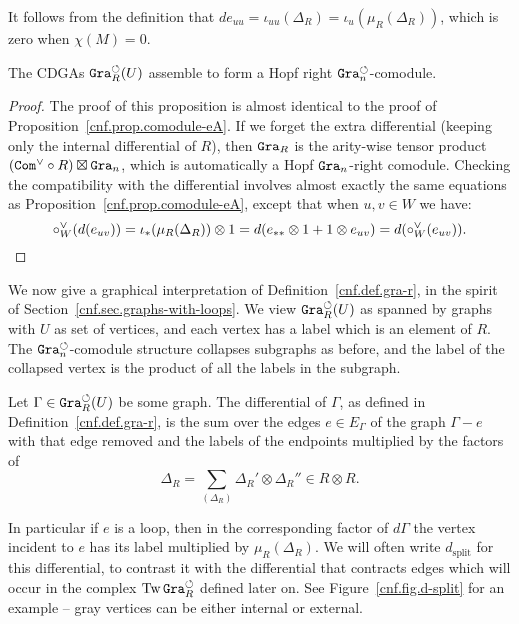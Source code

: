 \begin{remark}
  \label{cnf.rmk.loop-multi}
  It follows from the definition that $d e_{uu} = \iota_{uu}(\Delta_{R}) = \iota_{u}(\mu_{R}(\Delta_{R}))$, which is zero when $\chi(M) = 0$.
\end{remark}

\begin{proposition}
  \label{cnf.prop.gra-tad-comod}
  The CDGAs $\mathtt{Gra}^{\circlearrowleft}_{R}(U)$ assemble to form a Hopf right $\mathtt{Gra}^{\circlearrowleft}_{n}$-comodule.
\end{proposition}
\begin{proof}
  The proof of this proposition is almost identical to the proof of Proposition~\ref{cnf.prop.comodule-eA}.
  If we forget the extra differential (keeping only the internal differential of $R$), then $\mathtt{Gra}_{R}$ is the arity-wise tensor product $(\mathtt{Com}^{\vee} \circ R) \boxtimes \mathtt{Gra}_{n}$, which is automatically a Hopf $\mathtt{Gra}_{n}$-right comodule.
  Checking the compatibility with the differential involves almost exactly the same equations as Proposition~\ref{cnf.prop.comodule-eA}, except that when $u,v \in W$ we have:
  \[ \circ_{W}^{\vee}(d(e_{uv})) = \iota_{*}(\mu_{R}(\Delta_{R})) \otimes 1 = d(e_{**} \otimes 1 + 1 \otimes e_{uv}) = d(\circ_{W}^{\vee}(e_{uv})).
    \qedhere \]
\end{proof}

We now give a graphical interpretation of Definition~\ref{cnf.def.gra-r}, in the spirit of Section~\ref{cnf.sec.graphs-with-loops}.
We view $\mathtt{Gra}^{\circlearrowleft}_{R}(U)$ as spanned by graphs with $U$ as set of vertices, and each vertex has a label which is an element of $R$.
The $\mathtt{Gra}^{\circlearrowleft}_{n}$-comodule structure collapses subgraphs as before, and the label of the collapsed vertex is the product of all the labels in the subgraph.

Let $\Gamma \in \mathtt{Gra}_{R}^{\circlearrowleft}(U)$ be some graph.
The differential of $\Gamma$, as defined in Definition~\ref{cnf.def.gra-r}, is the sum over the edges $e \in E_{\Gamma}$ of the graph $\Gamma - e$ with that edge removed and the labels of the endpoints multiplied by the factors of
\[ \Delta_{R} = \sum_{(\Delta_{R})} \Delta_{R}' \otimes \Delta_{R}'' \in R \otimes R. \]

In particular if $e$ is a loop, then in the corresponding factor of $d\Gamma$ the vertex incident to $e$ has its label multiplied by $\mu_{R}(\Delta_{R})$.
We will often write $d_{\mathrm{split}}$ for this differential, to contrast it with the differential that contracts edges which will occur in the complex $\operatorname{Tw}\mathtt{Gra}^{\circlearrowleft}_{R}$ defined later on.
See Figure~\ref{cnf.fig.d-split} for an example -- gray vertices can be either internal or external.

